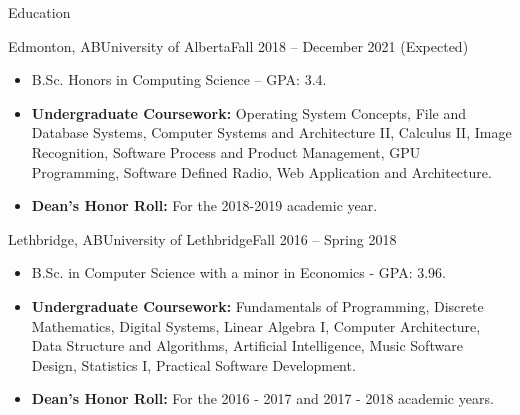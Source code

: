 \documentclass[]{mcdowellcv}
\begin{document}
\makeheader


\begin{cvsection}{Education}
  \begin{cvsubsection}{Edmonton, AB}{University of Alberta}{Fall 2018 -- December 2021 (Expected)}
    \begin{itemize}
      \item B.Sc. Honors in Computing Science -- GPA: 3.4.
      \item \textbf{Undergraduate Coursework:} 
        Operating System Concepts,
        File and Database Systems,
        Computer Systems and Architecture II,
        Calculus II,
        Image Recognition,
        Software Process and Product Management,
        GPU Programming, 
        Software Defined Radio, 
        Web Application and Architecture.
      \item \textbf{Dean's Honor Roll:} For the 2018-2019 academic year. 
    \end{itemize}
  \end{cvsubsection}

  \begin{cvsubsection}{Lethbridge, AB}{University of Lethbridge}{Fall 2016 -- Spring 2018}
    \begin{itemize}   
      \item B.Sc. in Computer Science with a minor in Economics - GPA: 3.96.
      \item \textbf{Undergraduate Coursework:} 
        Fundamentals of Programming,
        Discrete Mathematics,
        Digital Systems,
        Linear Algebra I,
        Computer Architecture,
        Data Structure and Algorithms,
        Artificial Intelligence,
        Music Software Design,
        Statistics I,
        Practical Software Development.
      \item \textbf{Dean's Honor Roll:} For the 2016 - 2017 and 2017 - 2018 academic years.
    \end{itemize}
  \end{cvsubsection}
\end{cvsection}
\end{document}

